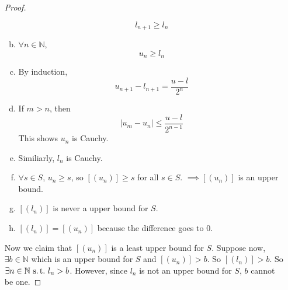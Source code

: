 \documentclass[12pt]{amsart}
\newcommand{\bbN}{\mathbb{N}}
\newcommand{\suchthat}{\operatorname{\thinspace s.t. \thinspace}}
\theoremstyle{plain}
\theoremstyle{remark}
\theoremstyle{definition}
\begin{document}
\begin{enumerate}[(1)]
\begin{proof}
\begin{enumerate}[(a)]
\begin{equation*}
						l_{n+1} \geqslant l_n
					\end{equation*}
				\item
					$\forall n \in \bbN$,
					\begin{equation*}
						u_n \geqslant l_n 
					\end{equation*}
				\item
					By induction,
					\begin{equation*}
						u_{n+1} - l_{n+1} = \frac{u-l}{2^n} 
					\end{equation*}
				\item
					If $m> n$, then
					\begin{equation*}
						|u_m - u_n| \leqslant \frac{u-l}{2^{n-1}}
					\end{equation*}
					\noindent This shows $u_n$ is Cauchy.
				\item
					Similiarly, $l_n$ is Cauchy.
				\item
					$\forall s\in S$, $u_n \geqslant s$, so $[(u_n)] \geqslant s$ for all $s\in S$.
					\newline
					$\implies[(u_n)]$ is an upper bound.
				\item
					$[(l_n)]$ is never a upper bound for $S$.
				\item
					$[(l_n)] = [(u_n)]$ because the difference goes to $0$.
			\end{enumerate}

			Now we claim that $[(u_n)]$ is a least upper bound for $S$. Suppose now, $\exists b \in \bbN$ which is an upper bound for $S$ and $[(u_n)]>b$. So $[(l_n)] > b$. So $\exists n \in \bbN \suchthat l_n > b$. However, since $l_n$ is not an upper bound for $S$, $b$ cannot be one.
			
		\end{proof}
\end{enumerate}
\end{document}
